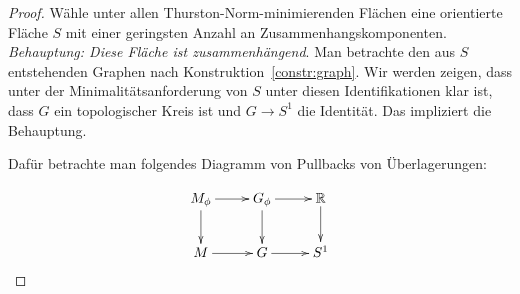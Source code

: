 \begin{proof}
	Wähle unter allen Thurston-Norm-minimierenden Flächen eine orientierte Fläche $S$ mit einer geringsten Anzahl an Zusammenhangskomponenten.\\
	\textit{Behauptung: Diese Fläche ist zusammenhängend}.
	Man betrachte den aus $S$ entstehenden Graphen nach Konstruktion~\ref{constr:graph}.
	Wir werden zeigen, dass unter der Minimalitätsanforderung von $S$ unter diesen Identifikationen klar ist, dass $G$ ein topologischer Kreis ist und $G\to S^1$ die Identität. Das impliziert die Behauptung.

	Dafür betrachte man folgendes Diagramm von Pullbacks von Überlagerungen:

	\[
	 	\begin{xy}
	 		\xymatrix{
	 			M_\phi \ar[r] \ar[d] & G_\phi \ar[d] \ar[r] & \RR \ar[d]\\
	 			M \ar[r] & G \ar[r] &S^1
	 		}
	 	\end{xy}
	 \] 

\end{proof}
